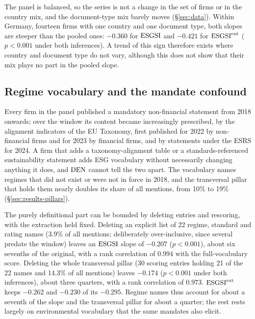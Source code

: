 The panel is balanced, so the series is not a change in the set of firms or in the country mix,
and the document-type mix barely moves (\S\ref{sec:data}). Within Germany, fourteen firms with
one country and one document type, both slopes are steeper than the pooled ones: $-0.360$ for
$\mathrm{ESGSI}$ and $-0.421$ for $\mathrm{ESGSI}^{\mathrm{ext}}$ ($p < 0.001$ under both inferences). A trend of this sign
therefore exists where country and document type do not vary, although this does not show that
their mix plays no part in the pooled slope.

\subsection{Regime vocabulary and the mandate confound}
\label{sec:results-mandate}

Every firm in the panel published a mandatory non-financial statement from 2018 onwards; over the
window its content became increasingly prescribed, by the alignment indicators of the EU
Taxonomy, first published for 2022 by non-financial firms and for 2023 by financial firms, and by
statements under the ESRS for 2024. A firm that adds a taxonomy-alignment table or a standards-referenced sustainability
statement adds ESG vocabulary without necessarily changing anything it does, and $\mathrm{DEN}$
cannot tell the two apart. The vocabulary names regimes that did not exist or were not in force
in 2018, and the transversal pillar that holds them nearly doubles its share of all mentions,
from 10\% to 19\% (\S\ref{sec:results-pillars}).

The purely definitional part can be bounded by deleting entries and rescoring, with the
extraction held fixed. Deleting an explicit list of 22 regime, standard and rating names (3.9\%
of all mentions; deliberately over-inclusive, since several predate the window) leaves an
$\mathrm{ESGSI}$ slope of $-0.207$ ($p < 0.001$), about six sevenths of the original, with a rank
correlation of $0.994$ with the full-vocabulary score. Deleting the whole transversal pillar (30
scoring entries holding 21 of the 22 names and 14.3\% of all mentions) leaves $-0.174$ ($p <
0.001$ under both inferences), about three quarters, with a rank correlation of $0.973$.
$\mathrm{ESGSI}^{\mathrm{ext}}$ keeps $-0.262$ and $-0.230$ of its $-0.295$. Regime names thus account for about a
seventh of the slope and the transversal pillar for about a quarter; the rest rests largely on
environmental vocabulary that the same mandates also elicit.

